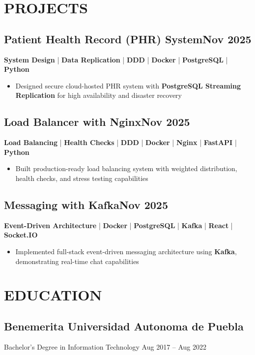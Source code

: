 \documentclass[a4paper,10pt]{article}
\newcommand{\kw}[1]{\textbf{\textcolor{keyword}{#1}}}
\newcommand{\tech}[1]{\textbf{\textcolor{tech}{#1}}}
\begin{document}
\section*{PROJECTS}

\subsection*{Patient Health Record (PHR) System\hfill Nov 2025}
\tech{System Design} | \tech{Data Replication} | \kw{DDD} | \tech{Docker} | \tech{PostgreSQL} | \tech{Python}
\begin{itemize}[noitemsep, leftmargin=*]
    \item Designed secure cloud-hosted PHR system with \kw{PostgreSQL Streaming Replication} for high availability and disaster recovery
\end{itemize}

\subsection*{Load Balancer with Nginx\hfill Nov 2025}
\tech{Load Balancing} | \kw{Health Checks} | \kw{DDD} | \tech{Docker} | \tech{Nginx} | \tech{FastAPI} | \tech{Python}
\begin{itemize}[noitemsep, leftmargin=*]
    \item Built production-ready load balancing system with weighted distribution, health checks, and stress testing capabilities
\end{itemize}

\subsection*{Messaging with Kafka\hfill Nov 2025}
\kw{Event-Driven Architecture} | \tech{Docker} | \tech{PostgreSQL} | \tech{Kafka} | \tech{React} | \tech{Socket.IO}
\begin{itemize}[noitemsep, leftmargin=*]
    \item Implemented full-stack event-driven messaging architecture using \kw{Kafka}, demonstrating real-time chat capabilities
\end{itemize}

\section*{EDUCATION}

\subsection*{Benemerita Universidad Autonoma de Puebla}
Bachelor's Degree in Information Technology \hfill Aug 2017 -- Aug 2022
\end{document}
